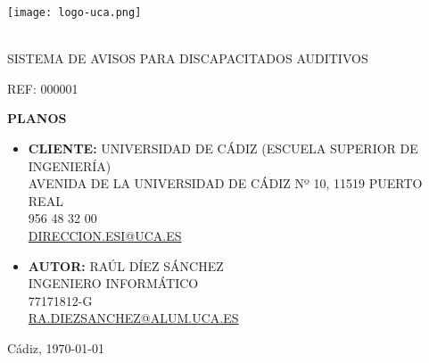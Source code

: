 \thispagestyle{empty}
\normalsize
\mdseries
\begin{center}

  \texttt{[image: logo-uca.png]} \\\

  \vspace{1.5cm}

  \huge{SISTEMA DE AVISOS PARA DISCAPACITADOS AUDITIVOS} \\
  
  \vspace{0.6cm}

  \large{REF: 000001} \\
  
  \vspace{1.0cm}

  \Huge{\textbf{PLANOS}} \\

  \vspace{2.5cm}
  

\end{center}
\begin{itemize}
\item {\textbf{CLIENTE:} UNIVERSIDAD DE CÁDIZ (ESCUELA SUPERIOR DE INGENIERÍA)\\
            AVENIDA DE LA UNIVERSIDAD DE CÁDIZ Nº 10, 11519 PUERTO REAL\\
            956 48 32 00\\
            \underline{DIRECCION.ESI@UCA.ES}
            }
            \vspace{0.5cm}
\item {\textbf{AUTOR:} RAÚL DÍEZ SÁNCHEZ\\
            INGENIERO INFORMÁTICO\\
            77171812-G\\
            \underline{RA.DIEZSANCHEZ@ALUM.UCA.ES}}
\end{itemize}

\vspace{0.2cm}

\begin{flushright}
  \large{Cádiz, \today} \\
\end{flushright}
